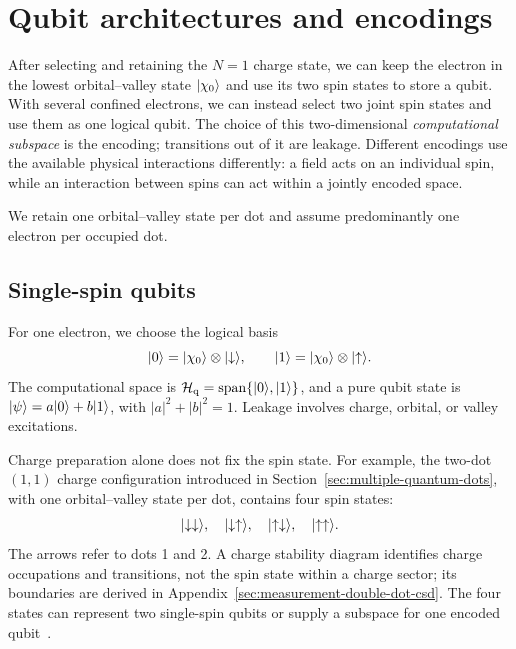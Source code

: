 \FloatBarrier
\section{Qubit architectures and encodings}
\label{sec:qubit-architectures}

After selecting and retaining the $N=1$ charge state, we can keep
the electron in the lowest orbital--valley state $\lvert \chi_0\rangle$ and
use its two spin states to store a qubit. With several confined
electrons, we can instead select two joint spin states and use them
as one logical qubit. The choice of this two-dimensional
\emph{computational subspace} is the encoding; transitions out of
it are leakage. Different encodings use the available physical
interactions differently: a field acts on an individual spin,
while an interaction between spins can act within a jointly
encoded space.

We retain one orbital--valley state per dot and assume predominantly
one electron per occupied dot.

\subsection{Single-spin qubits}
\label{sec:single-spin-qubits}

For one electron, we choose the logical basis
\begin{equation}
  \ket{0}=\ket{\chi_0}\otimes\ket{\downarrow},
  \qquad
  \ket{1}=\ket{\chi_0}\otimes\ket{\uparrow}.
  \label{eq:qubit-basis}
\end{equation}
The computational space is
$\mathcal{H}_{\mathrm q}=\operatorname{span}\{\lvert 0\rangle,\lvert 1\rangle\}$,
and a pure qubit state is $\lvert \psi\rangle=a\lvert 0\rangle+b\lvert 1\rangle$, with
$|a|^2+|b|^2=1$.
Leakage involves charge, orbital, or valley excitations.

Charge preparation alone does not fix the spin state.
For example, the two-dot $(1,1)$ charge configuration introduced
in Section~\ref{sec:multiple-quantum-dots}, with one orbital--valley
state per dot, contains four spin states:
\begin{equation}
  \ket{\downarrow\downarrow},\quad
  \ket{\downarrow\uparrow},\quad
  \ket{\uparrow\downarrow},\quad
  \ket{\uparrow\uparrow}.
  \label{eq:two-spin-basis}
\end{equation}
The arrows refer to dots 1 and 2. A charge stability diagram identifies
charge occupations and transitions, not the spin state within a charge
sector; its boundaries are derived in
Appendix~\ref{sec:measurement-double-dot-csd}.
The four states can represent two single-spin qubits or supply
a subspace for one encoded qubit~\cite{Burkard2023}.

